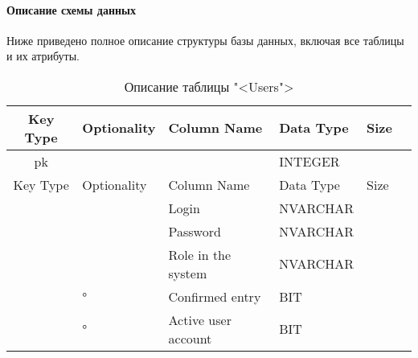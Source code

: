 \paragraph{Описание схемы данных}

Ниже приведено полное описание структуры базы данных, включая все таблицы и их атрибуты.

\begin{xltabular}{\textwidth}{|c|X|X|X|X|X|}
	\caption{Описание таблицы "<Users">\label{prod:table1}}\\ \hline
	\centrow Key Type & \centrow Optionality & \centrow Column Name & \centrow Data Type & \centrow Size \\ \hline
	\centrow pk & \centrow * &  & \centrow INTEGER & \\ \hline
	\endfirsthead
	\centrow Key Type & \centrow Optionality & \centrow Column Name & \centrow Data Type & \centrow Size \\ \hline
	\finishhead
	& \centrow * & \centrow Login & \centrow NVARCHAR &  \\ \hline 
	& \centrow * & \centrow Password & \centrow NVARCHAR &  \\ \hline
	& \centrow * & \centrow Role in the system & \centrow NVARCHAR &  \\ \hline 
	& \centrow ° & \centrow Confirmed entry & \centrow BIT & \centrow  \\ \hline 
	& \centrow ° & \centrow Active user account & \centrow BIT & \centrow  \\ \hline 
\end{xltabular}

